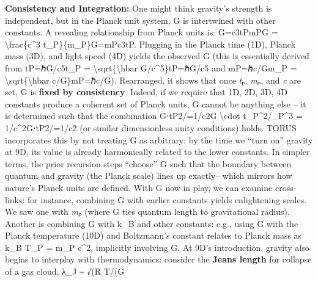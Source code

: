 \documentclass[
]{article}
\begin{document}
\textbf{Consistency and Integration:} One might think gravity's strength
is independent, but in the Planck unit system, G is intertwined with
other constants. A revealing relationship from Planck units is:
G=c3tPmPG = \textbackslash frac\{c\^{}3
t\_P\}\{m\_P\}G=mP\hspace{0pt}c3tP\hspace{0pt}\hspace{0pt}\hspace{0pt}.
Plugging in the Planck time (1D), Planck mass (3D), and light speed (4D)
yields the observed G (this is essentially derived from tP=ℏG/c5t\_P =
\textbackslash sqrt\{\textbackslash hbar
G/c\^{}5\}tP\hspace{0pt}=ℏG/c5\hspace{0pt} and mP=ℏc/Gm\_P =
\textbackslash sqrt\{\textbackslash hbar
c/G\}mP\hspace{0pt}=ℏc/G\hspace{0pt}). Rearranged, it shows that once
\emph{t}ₚ, \emph{m}ₚ, and \emph{c} are set, G is \textbf{fixed by
consistency}\hspace{0pt}. Indeed, if we require that 1D, 2D, 3D, 4D
constants produce a coherent set of Planck units, G cannot be anything
else -- it is determined such that the combination G⋅tP2/=1/c2G
\textbackslash cdot t\_P\^{}2/\ell\_P\^{}3 =
1/c\^{}2G⋅tP2\hspace{0pt}/\hspace{0pt}=1/c2 (or similar dimensionless
unity conditions) holds\hspace{0pt}. TORUS incorporates this by not
treating G as arbitrary: by the time we ``turn on'' gravity at 9D, its
value is already harmonically related to the lower
constants\hspace{0pt}. In simpler terms, the prior recursion steps
``choose'' G such that the boundary between quantum and gravity (the
Planck scale) lines up exactly\hspace{0pt}-- which mirrors how nature's
Planck units are defined. With G now in play, we can examine
cross-links: for instance, combining G with earlier constants yields
enlightening scales. We saw one with \emph{m}ₚ (where G ties quantum
length to gravitational radius). Another is combining G with k\_B and
other constants: e.g., using G with the Planck temperature (10D) and
Boltzmann's constant relates to Planck mass as k\_B T\_P = m\_P c\^{}2,
implicitly involving G\hspace{0pt}. At 9D's introduction, gravity also
begins to interplay with thermodynamics: consider the \textbf{Jeans
length} for collapse of a gas cloud, λ\_J \textasciitilde{} √(R T/(G
\end{document}
